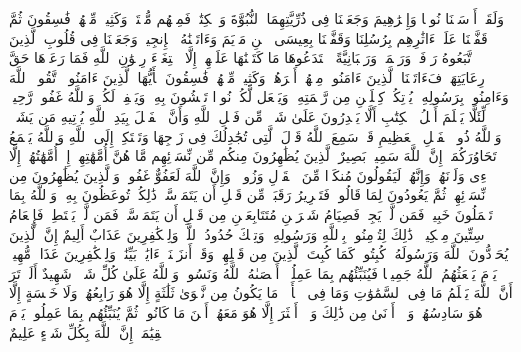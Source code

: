 \startbuffer[\q:57:26]
وَلَقَدۡ أَرۡسَلۡنَا نُوحࣰا وَإِبۡرَٰهِیمَ وَجَعَلۡنَا فِی ذُرِّیَّتِهِمَا ٱلنُّبُوَّةَ وَٱلۡكِتَٰبَۖ فَمِنۡهُم مُّهۡتَدࣲۖ وَكَثِیرࣱ مِّنۡهُمۡ فَٰسِقُونَ%
\stopbuffer
\startbuffer[\q:57:27]
ثُمَّ قَفَّیۡنَا عَلَىٰۤ ءَاثَٰرِهِم بِرُسُلِنَا وَقَفَّیۡنَا بِعِیسَى ٱبۡنِ مَرۡیَمَ وَءَاتَیۡنَٰهُ ٱلۡإِنجِیلَۖ وَجَعَلۡنَا فِی قُلُوبِ ٱلَّذِینَ ٱتَّبَعُوهُ رَأۡفَةࣰ وَرَحۡمَةࣰۚ وَرَهۡبَانِیَّةً ٱبۡتَدَعُوهَا مَا كَتَبۡنَٰهَا عَلَیۡهِمۡ إِلَّا ٱبۡتِغَاۤءَ رِضۡوَٰنِ ٱللَّهِ فَمَا رَعَوۡهَا حَقَّ رِعَایَتِهَاۖ فَءَاتَیۡنَا ٱلَّذِینَ ءَامَنُوا۟ مِنۡهُمۡ أَجۡرَهُمۡۖ وَكَثِیرࣱ مِّنۡهُمۡ فَٰسِقُونَ%
\stopbuffer
\startbuffer[\q:57:28]
یَٰۤأَیُّهَا ٱلَّذِینَ ءَامَنُوا۟ ٱتَّقُوا۟ ٱللَّهَ وَءَامِنُوا۟ بِرَسُولِهِۦ یُؤۡتِكُمۡ كِفۡلَیۡنِ مِن رَّحۡمَتِهِۦ وَیَجۡعَل لَّكُمۡ نُورࣰا تَمۡشُونَ بِهِۦ وَیَغۡفِرۡ لَكُمۡۚ وَٱللَّهُ غَفُورࣱ رَّحِیمࣱ%
\stopbuffer
\startbuffer[\q:57:29]
لِّئَلَّا یَعۡلَمَ أَهۡلُ ٱلۡكِتَٰبِ أَلَّا یَقۡدِرُونَ عَلَىٰ شَیۡءࣲ مِّن فَضۡلِ ٱللَّهِ وَأَنَّ ٱلۡفَضۡلَ بِیَدِ ٱللَّهِ یُؤۡتِیهِ مَن یَشَاۤءُۚ وَٱللَّهُ ذُو ٱلۡفَضۡلِ ٱلۡعَظِیمِ%
\stopbuffer
\startbuffer[\q:58:1]
قَدۡ سَمِعَ ٱللَّهُ قَوۡلَ ٱلَّتِی تُجَٰدِلُكَ فِی زَوۡجِهَا وَتَشۡتَكِیۤ إِلَى ٱللَّهِ وَٱللَّهُ یَسۡمَعُ تَحَاوُرَكُمَاۤۚ إِنَّ ٱللَّهَ سَمِیعُۢ بَصِیرٌ%
\stopbuffer
\startbuffer[\q:58:2]
ٱلَّذِینَ یُظَٰهِرُونَ مِنكُم مِّن نِّسَاۤئِهِم مَّا هُنَّ أُمَّهَٰتِهِمۡۖ إِنۡ أُمَّهَٰتُهُمۡ إِلَّا ٱلَّٰۤءِی وَلَدۡنَهُمۡۚ وَإِنَّهُمۡ لَیَقُولُونَ مُنكَرࣰا مِّنَ ٱلۡقَوۡلِ وَزُورࣰاۚ وَإِنَّ ٱللَّهَ لَعَفُوٌّ غَفُورࣱ%
\stopbuffer
\startbuffer[\q:58:3]
وَٱلَّذِینَ یُظَٰهِرُونَ مِن نِّسَاۤئِهِمۡ ثُمَّ یَعُودُونَ لِمَا قَالُوا۟ فَتَحۡرِیرُ رَقَبَةࣲ مِّن قَبۡلِ أَن یَتَمَاۤسَّاۚ ذَٰلِكُمۡ تُوعَظُونَ بِهِۦۚ وَٱللَّهُ بِمَا تَعۡمَلُونَ خَبِیرࣱ%
\stopbuffer
\startbuffer[\q:58:4]
فَمَن لَّمۡ یَجِدۡ فَصِیَامُ شَهۡرَیۡنِ مُتَتَابِعَیۡنِ مِن قَبۡلِ أَن یَتَمَاۤسَّاۖ فَمَن لَّمۡ یَسۡتَطِعۡ فَإِطۡعَامُ سِتِّینَ مِسۡكِینࣰاۚ ذَٰلِكَ لِتُؤۡمِنُوا۟ بِٱللَّهِ وَرَسُولِهِۦۚ وَتِلۡكَ حُدُودُ ٱللَّهِۗ وَلِلۡكَٰفِرِینَ عَذَابٌ أَلِیمٌ%
\stopbuffer
\startbuffer[\q:58:5]
إِنَّ ٱلَّذِینَ یُحَاۤدُّونَ ٱللَّهَ وَرَسُولَهُۥ كُبِتُوا۟ كَمَا كُبِتَ ٱلَّذِینَ مِن قَبۡلِهِمۡۚ وَقَدۡ أَنزَلۡنَاۤ ءَایَٰتِۭ بَیِّنَٰتࣲۚ وَلِلۡكَٰفِرِینَ عَذَابࣱ مُّهِینࣱ%
\stopbuffer
\startbuffer[\q:58:6]
یَوۡمَ یَبۡعَثُهُمُ ٱللَّهُ جَمِیعࣰا فَیُنَبِّئُهُم بِمَا عَمِلُوۤا۟ۚ أَحۡصَىٰهُ ٱللَّهُ وَنَسُوهُۚ وَٱللَّهُ عَلَىٰ كُلِّ شَیۡءࣲ شَهِیدٌ%
\stopbuffer
\startbuffer[\q:58:7]
أَلَمۡ تَرَ أَنَّ ٱللَّهَ یَعۡلَمُ مَا فِی ٱلسَّمَٰوَٰتِ وَمَا فِی ٱلۡأَرۡضِۖ مَا یَكُونُ مِن نَّجۡوَىٰ ثَلَٰثَةٍ إِلَّا هُوَ رَابِعُهُمۡ وَلَا خَمۡسَةٍ إِلَّا هُوَ سَادِسُهُمۡ وَلَاۤ أَدۡنَىٰ مِن ذَٰلِكَ وَلَاۤ أَكۡثَرَ إِلَّا هُوَ مَعَهُمۡ أَیۡنَ مَا كَانُوا۟ۖ ثُمَّ یُنَبِّئُهُم بِمَا عَمِلُوا۟ یَوۡمَ ٱلۡقِیَٰمَةِۚ إِنَّ ٱللَّهَ بِكُلِّ شَیۡءٍ عَلِیمٌ%
